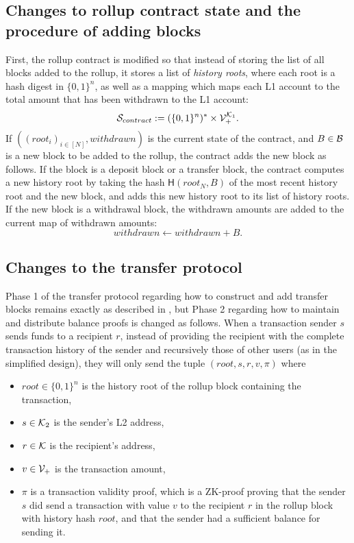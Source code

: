 \subsection{Changes to rollup contract state and the procedure of adding blocks}

First, the rollup contract is modified so that instead of storing the list of all blocks added to the rollup, it stores a list of \emph{history roots}, where each root is a hash digest in \(\{0,1\}^n\), as well as a mapping which maps each L1 account to the total amount that has been withdrawn to the L1 account: \[\mathcal{S}_{contract} := (\{0,1\}^n)^* \times \mathcal{V}_+^{\mathcal{K}_1}.\] If \(((root_i)_{i \in [N]}, withdrawn)\) is the current state of the contract, and \(B \in \mathcal{B}\) is a new block to be added to the rollup, the contract adds the new block as follows. If the block is a deposit block or a transfer block, the contract computes a new history root by taking the hash \(\mathsf{H}(root_N,B)\) of the most recent history root and the new block, and adds this new history root to its list of history roots. If the new block is a withdrawal block, the withdrawn amounts are added to the current map of withdrawn amounts: \[withdrawn \leftarrow withdrawn + B.\]

\subsection{Changes to the transfer protocol}

Phase 1 of the transfer protocol regarding how to construct and add transfer blocks remains exactly as described in , but Phase 2 regarding how to maintain and distribute balance proofs is changed as follows. When a transaction sender \(s\) sends funds to a recipient \(r\), instead of providing the recipient with the complete transaction history of the sender and recursively those of other users (as in the simplified design), they will only send the tuple \((root, s, r, v, \pi)\) where

\begin{itemize}
  \item \(root \in \{0,1\}^n\) is the history root of the rollup block containing the transaction,
  \item \(s \in \mathcal{K}_2\) is the sender's L2 address,
  \item \(r \in \mathcal{K}\) is the recipient's address,
  \item \(v \in \mathcal{V}_+\) is the transaction amount,
  \item \(\pi\) is a transaction validity proof, which is a ZK-proof proving that the sender \(s\) did send a transaction with value \(v\) to the recipient \(r\) in the rollup block with history hash \(root\), and that the sender had a sufficient balance for sending it.
\end{itemize}


